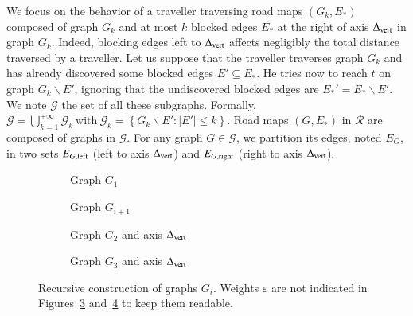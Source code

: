 \documentclass[preprint]{elsarticle}
\newcommand{\set}[1]{\left\{ #1 \right\}}
\newcommand{\card}[1]{\left| #1 \right|}
\newcommand{\mcalg}{\mathcal{G}}
\newcommand{\mcalr}{\mathcal{R}}
\newcommand{\deltavert}{\Delta_{\mbox{\scriptsize{vert}}}}
\newcommand{\eleft}[1]{E_{#1, \mbox{\scriptsize{left}}}}
\newcommand{\eright}[1]{E_{#1, \mbox{\scriptsize{right}}}}
\begin{document}

We focus on the behavior of a traveller traversing road maps $\left(G_k,E_*\right)$ composed of graph $G_k$ and at most $k$ blocked edges $E_*$ at the right of axis $\deltavert$ in graph $G_k$. Indeed, blocking edges left to $\deltavert$ affects negligibly the total distance traversed by a traveller. Let us suppose that the traveller traverses graph $G_k$ and has already discovered some blocked edges $E' \subseteq E_*$. He tries now to reach $t$ on graph $G_k\backslash E'$, ignoring that the undiscovered blocked edges are $E_*' = E_* \backslash E'$.
We note $\mcalg$ the set of all these subgraphs. Formally, $\mcalg = \bigcup_{k=1}^{+\infty} \mcalg_k ~\mbox{with}~
\mcalg_k = \set{G_k\backslash E' : \card{E'} \leq k}$. Road maps $\left(G,E_*\right)$ in $\mcalr$ are composed of graphs in $\mcalg$. For any graph $G \in \mcalg$, we partition its edges, noted $E_G$, in two sets $\eleft{G}$ (left to axis $\deltavert$) and $\eright{G}$ (right to axis $\deltavert$).

\begin{figure}[h]
\centering
\begin{subfigure}[b]{0.49\columnwidth}
\centering
\scalebox{.52}{}
\caption{Graph $G_1$}
\label{subfig:G_1}
\end{subfigure}
\begin{subfigure}[b]{0.49\columnwidth}
\centering
\scalebox{.52}{}
\caption{Graph $G_{i+1}$}
\label{subfig:G_i}
\end{subfigure}
\begin{subfigure}[b]{0.49\columnwidth}
\centering
\scalebox{.45}{}
\caption{Graph $G_2$ and axis $\deltavert$}
\label{subfig:G_2}
\end{subfigure}
\begin{subfigure}[b]{0.49\columnwidth}
\centering
\scalebox{0.45}{}
\caption{Graph $G_3$ and axis $\deltavert$}
\label{subfig:G_3}
\end{subfigure}
\caption{Recursive construction of graphs $G_i$. Weights $\varepsilon$ are not indicated in Figures~\ref{subfig:G_2} and~\ref{subfig:G_3} to keep them readable.}
\label{fig:G_i}
\end{figure}
\end{document}
